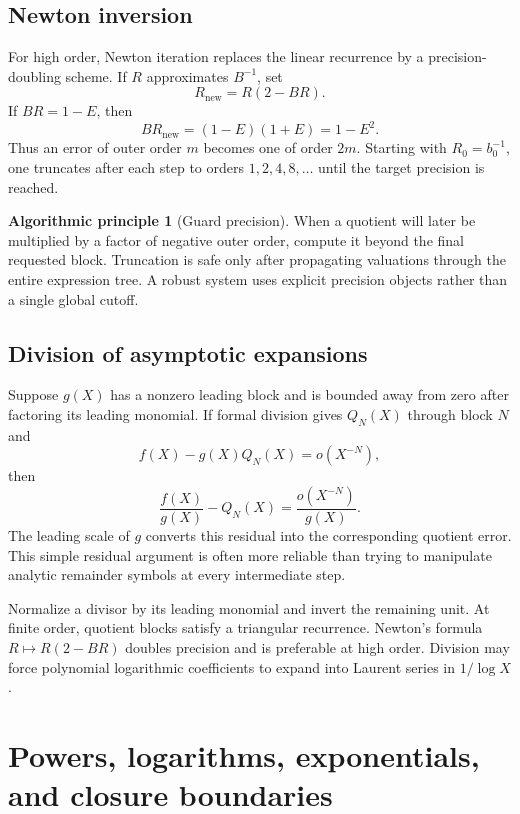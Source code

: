 \documentclass[11pt,oneside]{book}
\theoremstyle{definition}
\newtheorem{algorithmicprinciple}[theorem]{Algorithmic principle}
\theoremstyle{remark}
\begin{document}
\section{Newton inversion}
For high order, Newton iteration replaces the linear recurrence by a
precision-doubling scheme.  If $R$ approximates $B^{-1}$, set
\begin{equation}\label{eq:newton-reciprocal}
 R_{\mathrm{new}}=R(2-BR).
\end{equation}
If $BR=1-E$, then
\[
 BR_{\mathrm{new}}=(1-E)(1+E)=1-E^2.
\]
Thus an error of outer order $m$ becomes one of order $2m$.  Starting with
$R_0=b_0^{-1}$, one truncates after each step to orders
$1,2,4,8,\ldots$ until the target precision is reached.

\begin{algorithmicprinciple}[Guard precision]
When a quotient will later be multiplied by a factor of negative outer order,
compute it beyond the final requested block.  Truncation is safe only after
propagating valuations through the entire expression tree.  A robust system
uses explicit precision objects rather than a single global cutoff.
\end{algorithmicprinciple}

\section{Division of asymptotic expansions}
Suppose $g(X)$ has a nonzero leading block and is bounded away from zero after
factoring its leading monomial.  If formal division gives
$Q_N(X)$ through block $N$ and
\[
 f(X)-g(X)Q_N(X)=o(X^{-N}),
\]
then
\[
 \frac{f(X)}{g(X)}-Q_N(X)
 =\frac{o(X^{-N})}{g(X)}.
\]
The leading scale of $g$ converts this residual into the corresponding
quotient error.  This simple residual argument is often more reliable than
trying to manipulate analytic remainder symbols at every intermediate step.

\begin{summarybox}
Normalize a divisor by its leading monomial and invert the remaining unit.
At finite order, quotient blocks satisfy a triangular recurrence.  Newton's
formula $R\mapsto R(2-BR)$ doubles precision and is preferable at high order.
Division may force polynomial logarithmic coefficients to expand into Laurent
series in $1/\log X$.
\end{summarybox}


\chapter{Powers, logarithms, exponentials, and closure boundaries}
\label{ch:powers}
\end{document}
